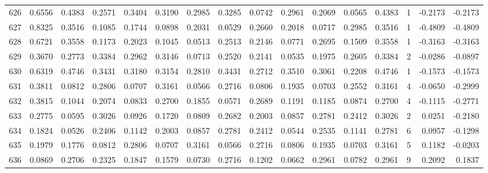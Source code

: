 \begin{tabular}{lrrrrrrrrrrrrrrr}
626 &      0.6556 &  0.4383 &  0.2571 &  0.3404 &  0.3190 &  0.2985 &  0.3285 &  0.0742 &  0.2961 &  0.2069 &   0.0565 &     0.4383 &      1 &                   -0.2173 &                    -0.2173 \\
627 &      0.8325 &  0.3516 &  0.1085 &  0.1744 &  0.0898 &  0.2031 &  0.0529 &  0.2660 &  0.2018 &  0.0717 &   0.2985 &     0.3516 &      1 &                   -0.4809 &                    -0.4809 \\
628 &      0.6721 &  0.3558 &  0.1173 &  0.2023 &  0.1045 &  0.0513 &  0.2513 &  0.2146 &  0.0771 &  0.2695 &   0.1509 &     0.3558 &      1 &                   -0.3163 &                    -0.3163 \\
629 &      0.3670 &  0.2773 &  0.3384 &  0.2962 &  0.3146 &  0.0713 &  0.2520 &  0.2141 &  0.0535 &  0.1975 &   0.2605 &     0.3384 &      2 &                   -0.0286 &                    -0.0897 \\
630 &      0.6319 &  0.4746 &  0.3431 &  0.3180 &  0.3154 &  0.2810 &  0.3431 &  0.2712 &  0.3510 &  0.3061 &   0.2208 &     0.4746 &      1 &                   -0.1573 &                    -0.1573 \\
631 &      0.3811 &  0.0812 &  0.2806 &  0.0707 &  0.3161 &  0.0566 &  0.2716 &  0.0806 &  0.1935 &  0.0703 &   0.2552 &     0.3161 &      4 &                   -0.0650 &                    -0.2999 \\
632 &      0.3815 &  0.1044 &  0.2074 &  0.0833 &  0.2700 &  0.1855 &  0.0571 &  0.2689 &  0.1191 &  0.1185 &   0.0874 &     0.2700 &      4 &                   -0.1115 &                    -0.2771 \\
633 &      0.2775 &  0.0595 &  0.3026 &  0.0926 &  0.1720 &  0.0809 &  0.2682 &  0.2003 &  0.0857 &  0.2781 &   0.2412 &     0.3026 &      2 &                    0.0251 &                    -0.2180 \\
634 &      0.1824 &  0.0526 &  0.2406 &  0.1142 &  0.2003 &  0.0857 &  0.2781 &  0.2412 &  0.0544 &  0.2535 &   0.1141 &     0.2781 &      6 &                    0.0957 &                    -0.1298 \\
635 &      0.1979 &  0.1776 &  0.0812 &  0.2806 &  0.0707 &  0.3161 &  0.0566 &  0.2716 &  0.0806 &  0.1935 &   0.0703 &     0.3161 &      5 &                    0.1182 &                    -0.0203 \\
636 &      0.0869 &  0.2706 &  0.2325 &  0.1847 &  0.1579 &  0.0730 &  0.2716 &  0.1202 &  0.0662 &  0.2961 &   0.0782 &     0.2961 &      9 &                    0.2092 &                     0.1837 \\

\end{tabular}
